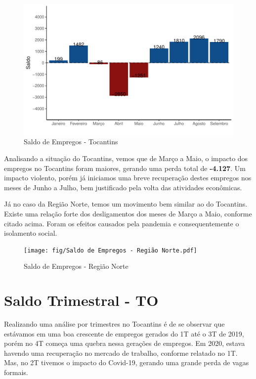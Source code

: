 \begin{figure}[h]
	\caption{Saldo de Empregos - Tocantins}
	\includegraphics[width=\linewidth]{fig/Saldo de empregos - Tocantins.pdf}
\end{figure}

\par Analisando a situação do Tocantins, vemos que de Março a Maio, o impacto dos
empregos no Tocantins foram maiores, gerando uma perda total de \textbf{-4.127}. Um impacto
violento, porém já iniciamos uma breve recuperação destes empregos nos meses de Junho
a Julho, bem justificado pela volta das atividades econômicas.

\par Já no caso da Região Norte, temos um movimento bem similar ao do Tocantins. Existe
uma relação forte dos desligamentos dos meses de Março a Maio, conforme citado acima.
Foram os efeitos causados pela pandemia e consequentemente o isolamento social.

\begin{figure}[h]
	\caption{Saldo de Empregos - Região Norte}
	\texttt{[image: fig/Saldo de Empregos - Região Norte.pdf]}
\end{figure}

\section{Saldo Trimestral - TO}
\par Realizando uma análise por trimestres no Tocantins é de se observar que estávamos em uma boa crescente de empregos gerados do 1T até o 3T de 2019, porém no 4T começa uma quebra nessa gerações de empregos. Em 2020, estava havendo uma recuperação no mercado de trabalho, conforme relatado no 1T. Mas, no 2T tivemos o impacto do Covid-19, gerando uma grande perda de vagas formais.

